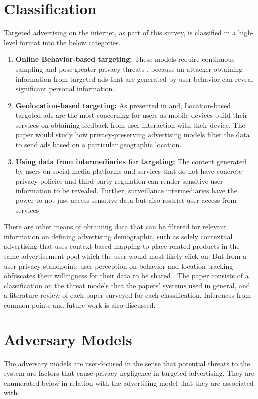 \documentclass[sigconf,nonacm]{acmart}
\begin{document}
\section{Classification}
Targeted advertising on the internet, as part of this survey, is classified in a high-level format into the below categories.
\begin{enumerate}

    \item \textbf{Online Behavior-based targeting:} 
    These models require continuous sampling and pose greater privacy threats \cite{10.1007/978-3-642-31680-7_1}, because an attacker obtaining information from targeted ads that are generated by user-behavior can reveal significant personal information. \cite{Adnostic}

     \item \textbf{Geolocation-based targeting:} 
    As presented in and, Location-based targeted ads are the most concerning for users as mobile devices build their services on obtaining feedback from user interaction with their device. The paper would study how privacy-preserving advertising models filter the data to send ads based on a particular geographic location. 

    \item \textbf{Using data from intermediaries for targeting:}
    The content generated by users on social media platforms and services that do not have concrete privacy policies and third-party regulation can render sensitive user information to be revealed. Further, surveillance intermediaries have the power to not just access sensitive data but also restrict user access from services \cite{FBPII}
\end{enumerate}
There are other means of obtaining data that can be filtered for relevant information on defining advertising demographic, such as solely contextual advertising that uses context-based mapping to place related products in the same advertisement pool which the user would most likely click on. But from a user privacy standpoint, user perception on behavior and location tracking obfuscates their willingness for their data to be shared \cite{userperception}. The paper consists of a classification on the threat models that the papers' systems used in general, and a literature review of each paper surveyed for each classification. Inferences from common points and future work is also discussed.

\section{Adversary Models}
The adversary models are user-focused in the sense that potential threats to the system are factors that cause privacy-negligence in targeted advertising. They are enumerated below in relation with the advertising model that they are associated with. 
\end{document}
